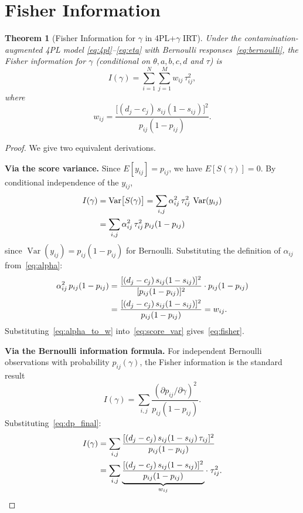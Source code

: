 \documentclass[11pt,a4paper]{article}
\newtheorem{theorem}{Theorem}
\theoremstyle{definition}
\DeclareMathOperator{\Var}{Var}
\begin{document}
\section{Fisher Information}\label{sec:fisher}

\begin{theorem}[Fisher Information for $\gamma$ in 4PL+$\gamma$ IRT]\label{thm:fisher}
Under the contamination-augmented 4PL model
\eqref{eq:4pl}--\eqref{eq:eta} with Bernoulli responses~\eqref{eq:bernoulli},
the Fisher information for $\gamma$
(conditional on $\theta, a, b, c, d$ and $\tau$) is
\begin{equation}\label{eq:fisher}
  I(\gamma)
  = \sum_{i=1}^{N}\sum_{j=1}^{M} w_{ij}\,\tau_{ij}^2,
\end{equation}
where
\begin{equation}\label{eq:weight}
  w_{ij}
  = \frac{\bigl[(d_j - c_j)\,s_{ij}(1-s_{ij})\bigr]^2}{p_{ij}(1-p_{ij})}.
\end{equation}
\end{theorem}

\begin{proof}
We give two equivalent derivations.

\medskip\noindent\textbf{Via the score variance.}\quad
Since $E[y_{ij}] = p_{ij}$, we have $E[S(\gamma)] = 0$.
By conditional independence of the $y_{ij}$,
\begin{align}
  I(\gamma)
  &= \Var\bigl[S(\gamma)\bigr]
  = \sum_{i,j} \alpha_{ij}^2\,\tau_{ij}^2\,\Var(y_{ij})
  \notag\\
  &= \sum_{i,j} \alpha_{ij}^2\,\tau_{ij}^2\,p_{ij}(1-p_{ij})
  \label{eq:score_var}
\end{align}
since $\Var(y_{ij}) = p_{ij}(1-p_{ij})$ for Bernoulli.
Substituting the definition of $\alpha_{ij}$ from~\eqref{eq:alpha}:
\begin{align}
  \alpha_{ij}^2\,p_{ij}(1-p_{ij})
  &= \frac{[(d_j-c_j)\,s_{ij}(1-s_{ij})]^2}{[p_{ij}(1-p_{ij})]^2}
     \cdot p_{ij}(1-p_{ij})
  \notag\\
  &= \frac{[(d_j-c_j)\,s_{ij}(1-s_{ij})]^2}{p_{ij}(1-p_{ij})}
  = w_{ij}.
  \label{eq:alpha_to_w}
\end{align}
Substituting~\eqref{eq:alpha_to_w} into~\eqref{eq:score_var} gives~\eqref{eq:fisher}.

\medskip\noindent\textbf{Via the Bernoulli information formula.}\quad
For independent Bernoulli observations with probability $p_{ij}(\gamma)$,
the Fisher information is the standard result
\begin{equation}\label{eq:bern_info}
  I(\gamma)
  = \sum_{i,j} \frac{(\partial p_{ij}/\partial\gamma)^2}{p_{ij}(1-p_{ij})}.
\end{equation}
Substituting~\eqref{eq:dp_final}:
\begin{align*}
  I(\gamma)
  &= \sum_{i,j}
     \frac{[(d_j-c_j)\,s_{ij}(1-s_{ij})\,\tau_{ij}]^2}{p_{ij}(1-p_{ij})} \\
  &= \sum_{i,j}
     \underbrace{\frac{[(d_j-c_j)\,s_{ij}(1-s_{ij})]^2}{p_{ij}(1-p_{ij})}}_{w_{ij}}
     \cdot\;\tau_{ij}^2.
     \qedhere
\end{align*}
\end{proof}
\end{document}
